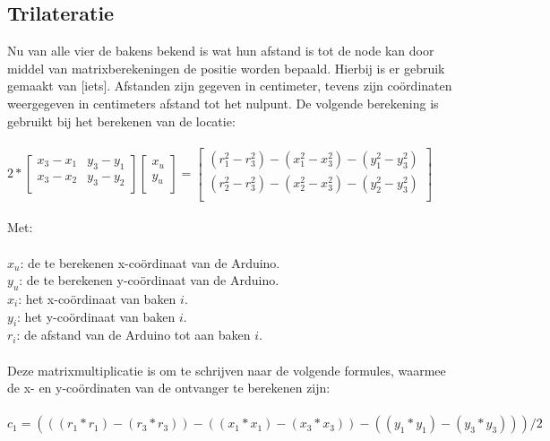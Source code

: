 \documentclass{article}
\begin{document}
\subsection{Trilateratie}
Nu van alle vier de bakens bekend is wat hun afstand is tot de node kan door middel van matrixberekeningen de positie worden bepaald. Hierbij is er gebruik gemaakt van [iets]. Afstanden zijn gegeven in centimeter, tevens zijn co\"ordinaten weergegeven in centimeters afstand tot het nulpunt.
De volgende berekening is gebruikt bij het berekenen van de locatie: \\
\\
\indent$2*\begin{bmatrix}
       x_3 - x_1 & y_3 - y_1 \\
       x_3 - x_2 & y_3 - y_2 \\          
                
     \end{bmatrix}
     \begin{bmatrix}
       x_u \\          
       y_u \\         
     \end{bmatrix}
=\begin{bmatrix}
       (r_1^2 - r_3^2) - (x_1^2 - x_3^2) - (y_1^2 - y_3^2) \\
       (r_2^2 - r_3^2) - (x_2^2 - x_3^2) - (y_2^2 - y_3^2) \\
     \end{bmatrix}$ \\
 \\
Met: \\
\\
\indent$x_u$: de te berekenen x-co\"{o}rdinaat van de Arduino.\\
\indent$y_u$: de te berekenen y-co\"{o}rdinaat van de Arduino.\\
\indent$x_i$: het x-co\"{o}rdinaat van baken $i$.\\
\indent$y_i$: het y-co\"{o}rdinaat van baken $i$.\\
\indent$r_i$: de afstand van de Arduino tot aan baken $i$.\\
\\
Deze matrixmultiplicatie is om te schrijven naar de volgende formules, waarmee de x- en y-co\"ordinaten van de ontvanger te berekenen zijn: \\
\\
\indent$c_1 = (((r_1*r_1)-(r_3*r_3))-((x_1*x_1)-(x_3*x_3))-((y_1*y_1)-(y_3*y_3)))/2 $\\
\end{document}
